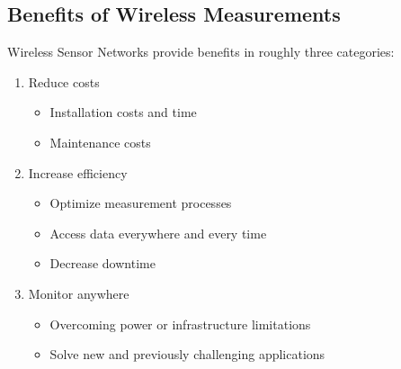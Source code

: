\subsection{Benefits of Wireless Measurements}
Wireless Sensor Networks provide benefits in roughly three categories:
\begin{enumerate}
\item Reduce costs
\begin{itemize}
\item Installation costs and time
\item Maintenance costs
\end{itemize}
\item Increase efficiency
\begin{itemize}
\item Optimize measurement processes
\item Access data everywhere and every time
\item Decrease downtime
\end{itemize}
\item Monitor anywhere
\begin{itemize}
\item Overcoming power or infrastructure limitations
\item Solve new and previously challenging applications
\end{itemize}
\end{enumerate}
